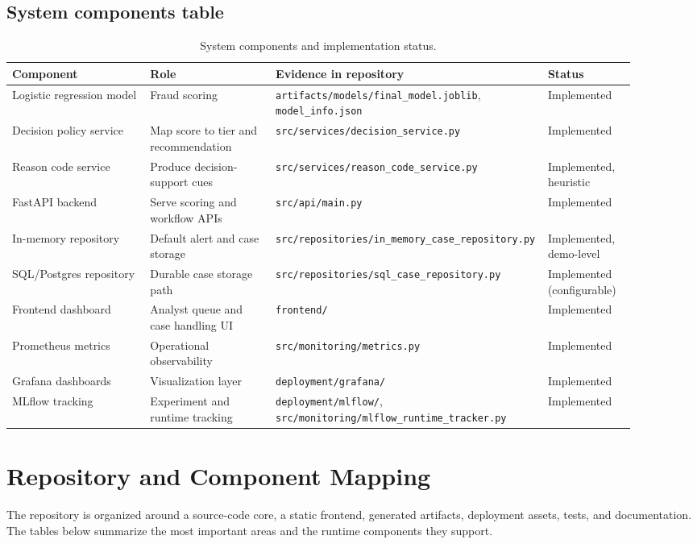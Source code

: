 \documentclass[11pt]{article}
\newcommand{\code}[1]{\texttt{#1}}
\begin{document}
\subsection{System components table}
\begin{table}[H]
\centering
\begin{tabular}{p{0.22\linewidth}p{0.2\linewidth}p{0.34\linewidth}p{0.14\linewidth}}
\toprule
Component & Role & Evidence in repository & Status \\
\midrule
Logistic regression model & Fraud scoring & \code{artifacts/models/final_model.joblib}, \code{model_info.json} & Implemented \\
Decision policy service & Map score to tier and recommendation & \code{src/services/decision_service.py} & Implemented \\
Reason code service & Produce decision-support cues & \code{src/services/reason_code_service.py} & Implemented, heuristic \\
FastAPI backend & Serve scoring and workflow APIs & \code{src/api/main.py} & Implemented \\
In-memory repository & Default alert and case storage & \code{src/repositories/in_memory_case_repository.py} & Implemented, demo-level \\
SQL/Postgres repository & Durable case storage path & \code{src/repositories/sql_case_repository.py} & Implemented (configurable) \\
Frontend dashboard & Analyst queue and case handling UI & \code{frontend/} & Implemented \\
Prometheus metrics & Operational observability & \code{src/monitoring/metrics.py} & Implemented \\
Grafana dashboards & Visualization layer & \code{deployment/grafana/} & Implemented \\
MLflow tracking & Experiment and runtime tracking & \code{deployment/mlflow/}, \code{src/monitoring/mlflow_runtime_tracker.py} & Implemented \\
\bottomrule
\end{tabular}
\caption{System components and implementation status.}
\end{table}

\section{Repository and Component Mapping}
The repository is organized around a source-code core, a static frontend, generated artifacts, deployment assets, tests, and documentation. The tables below summarize the most important areas and the runtime components they support.
\end{document}
